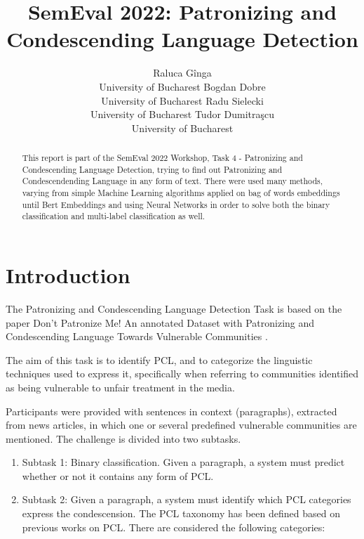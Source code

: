 \documentclass[11pt]{article}
\begin{document}
\title{SemEval 2022: Patronizing and Condescending Language Detection}
\author{Raluca G\^inga \\
	University of Bucharest
	\And Bogdan Dobre \\
	University of Bucharest
	\And Radu Sielecki \\
	University of Bucharest
	\And Tudor Dumitra\c{s}cu\\
	University of Bucharest
}
\date{}
\maketitle

\begin{abstract}
	This report is part of the SemEval 2022 Workshop, Task 4 - Patronizing and
	Condescending Language Detection, trying to find out Patronizing and
	Condescendending Language in any form of text. There were used many methods,
	varying from simple Machine Learning algorithms applied on bag of words
	embeddings until Bert Embeddings and using Neural Networks in order to solve
	both the binary classification and multi-label classification as well.
\end{abstract}

\section{Introduction}

The Patronizing and Condescending Language Detection Task is based on the
paper Don't Patronize Me! An annotated Dataset with Patronizing and
Condescending Language Towards Vulnerable Communities \cite{perezalmendros2020dont}.

The aim of this task is to identify PCL, and to categorize the linguistic
techniques used to express it, specifically when referring to communities
identified as being vulnerable to unfair treatment in the media.

Participants were provided with sentences in context (paragraphs), extracted
from news articles, in which one or several predefined vulnerable
communities are mentioned. The challenge is divided into two subtasks.

\begin{enumerate}
	\item Subtask 1: Binary classification. Given a paragraph, a system must
	      predict whether or not it contains any form of PCL.

	\item Subtask 2: Given a paragraph, a system must identify which PCL
	      categories express the condescension. The PCL taxonomy has been defined
	      based on previous works on PCL. There are considered the following
	      categories:
\end{enumerate}
\end{document}

